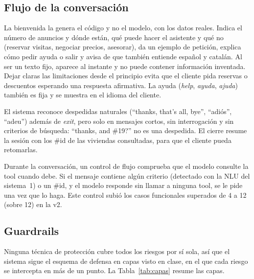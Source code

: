 \documentclass[10pt,a4paper]{article}
\begin{document}
\subsection{Flujo de la conversación}

La bienvenida la genera el código y no el modelo, con los datos reales. Indica el número de anuncios y dónde están, qué puede hacer el asistente y qué no (reservar visitas, negociar precios, asesorar), da un ejemplo de petición, explica cómo pedir ayuda o salir y avisa de que también entiende español y catalán. Al ser un texto fijo, aparece al instante y no puede contener información inventada. Dejar claras las limitaciones desde el principio evita que el cliente pida reservas o descuentos esperando una respuesta afirmativa. La ayuda (\emph{help}, \emph{ayuda}, \emph{ajuda}) también es fija y se muestra en el idioma del cliente.

El sistema reconoce despedidas naturales (``thanks, that's all, bye'', ``adiós'', ``adeu'') además de \emph{exit}, pero solo en mensajes cortos, sin interrogación y sin criterios de búsqueda: ``thanks, and \#19?'' no es una despedida. El cierre resume la sesión con los \#id de las viviendas consultadas, para que el cliente pueda retomarlas.

Durante la conversación, un control de flujo comprueba que el modelo consulte la tool cuando debe. Si el mensaje contiene algún criterio (detectado con la NLU del sistema~1) o un \#id, y el modelo responde sin llamar a ninguna tool, se le pide una vez que lo haga. Este control subió los casos funcionales superados de 4 a 12 (sobre 12) en la v2.

\subsection{Guardrails}

Ninguna técnica de protección cubre todos los riesgos por sí sola, así que el sistema sigue el esquema de defensa en capas visto en clase, en el que cada riesgo se intercepta en más de un punto. La Tabla~\ref{tab:capas} resume las capas.
\end{document}
